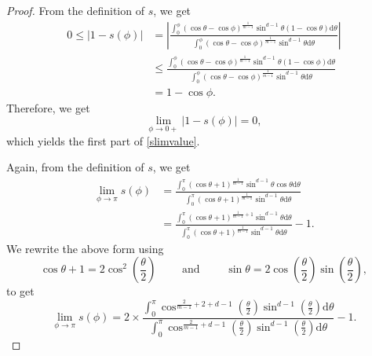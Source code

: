 \documentclass[11pt]{amsart}
\def\d{\mathrm{d}}
\newcommand{\dm}{d} %
\begin{document}
\begin{proof}
 From the definition of $s$, we get
\begin{align*}
0\leq|1-s(\phi)|&=\left|
\frac{ \int_0^\phi
(\cos\theta-\cos\phi)^{\frac{1}{m-1}}
\sin^{d-1}\theta (1-\cos\theta)\d\theta}
{\int_0^\phi
(\cos\theta-\cos\phi)^{\frac{1}{m-1}}
\sin^{d-1}\theta\d\theta}\right|\\
&\leq 
\frac{ \int_0^\phi
(\cos\theta-\cos\phi)^{\frac{1}{m-1}}
\sin^{d-1}\theta (1-\cos\phi)\d\theta}
{\int_0^\phi
(\cos\theta-\cos\phi)^{\frac{1}{m-1}}
\sin^{d-1}\theta\d\theta}\\
&=1-\cos\phi.
\end{align*}
Therefore, we get
\[
\lim_{\phi\to0+}|1-s(\phi)|=0,
\]
which yields the first part of \eqref{slimvalue}.
\medskip

 Again, from the definition of $s$, we get
\begin{align*}
\lim_{\phi\to\pi}s(\phi)&=\frac{\int_0^\pi (\cos\theta+1)^{\frac{1}{m-1}}\sin^{\dm-1}\theta \cos\theta\d\theta}{\int_0^\pi (\cos\theta+1)^{\frac{1}{m-1}}\sin^{\dm-1}\theta\d\theta}\\
&=\frac{\int_0^\pi (\cos\theta+1)^{\frac{1}{m-1}+1}\sin^{\dm-1}\theta \d\theta}{\int_0^\pi (\cos\theta+1)^{\frac{1}{m-1}}\sin^{\dm-1}\theta\d\theta}-1.
\end{align*}
We rewrite the above form using
\[
\cos\theta+1=2\cos^2\left(\frac{\theta}{2}\right) \qquad\text{ and }\qquad \sin\theta=2\cos\left(\frac{\theta}{2}\right)\sin\left(\frac{\theta}{2}\right),
\]
to get
\begin{equation}
\label{eqn:limphipi}
\lim_{\phi\to\pi}s(\phi)=2\times\frac{\int_0^\pi \cos^{\frac{2}{m-1}+2+\dm-1}\left(\frac{\theta}{2}\right)\sin^{\dm-1}\left(\frac{\theta}{2}\right)\d\theta}{\int_0^\pi \cos^{\frac{2}{m-1}+\dm-1}\left(\frac{\theta}{2}\right)\sin^{\dm-1}\left(\frac{\theta}{2}\right)\d\theta}-1.
\end{equation}


\end{proof}
\end{document}
